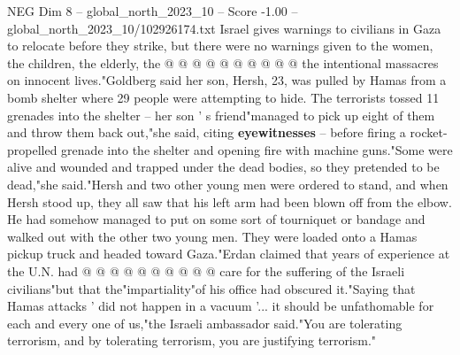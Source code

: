 \begin{textsample}{NEG Dim 8 – global\_north\_2023\_10 – Score -1.00 – global\_north\_2023\_10/102926174.txt}
Israel gives warnings to civilians in Gaza to relocate before they strike, but there were no warnings given to the women, the children, the elderly, the @ @ @ @ @ @ @ @ @ @ the intentional massacres on innocent lives."Goldberg said her son, Hersh, 23, was pulled by Hamas from a bomb shelter where 29 people were attempting to hide.
The terrorists tossed 11 grenades into the shelter -- her son ' s friend"managed to pick up eight of them and throw them back out,"she said, citing \textbf{eyewitnesses} -- before firing a rocket-propelled grenade into the shelter and opening fire with machine guns."Some were alive and wounded and trapped under the dead bodies, so they pretended to be dead,"she said."Hersh and two other young men were ordered to stand, and when Hersh stood up, they all saw that his left arm had been blown off from the elbow.
He had somehow managed to put on some sort of tourniquet or bandage and walked out with the other two young men.
They were loaded onto a Hamas pickup truck and headed toward Gaza."Erdan claimed that years of experience at the U.N. had @ @ @ @ @ @ @ @ @ @ care for the suffering of the Israeli civilians"but that the"impartiality"of his office had obscured it."Saying that Hamas attacks ' did not happen in a vacuum '... it should be unfathomable for each and every one of us,"the Israeli ambassador said."You are tolerating terrorism, and by tolerating terrorism, you are justifying terrorism."

\end{textsample}
